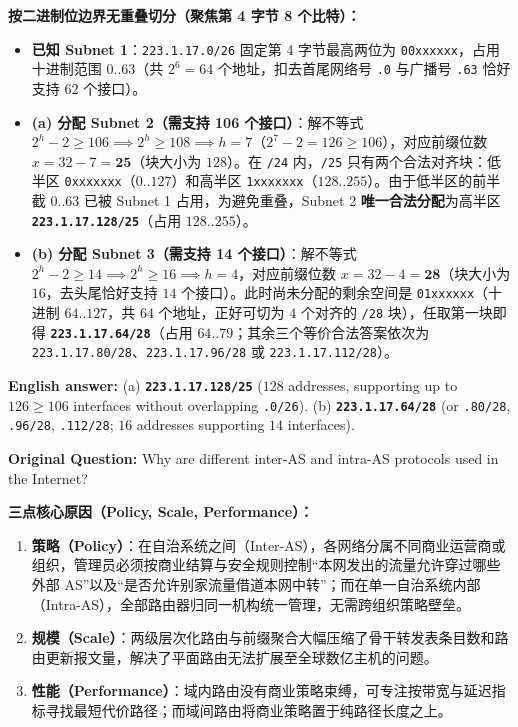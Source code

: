\textbf{按二进制位边界无重叠切分（聚焦第 4 字节 8 个比特）：}
\begin{itemize}
\item \textbf{已知 Subnet 1}：\texttt{223.1.17.0/26} 固定第 4 字节最高两位为 \texttt{00xxxxxx}，占用十进制范围 $0..63$（共 $2^6 = 64$ 个地址，扣去首尾网络号 \texttt{.0} 与广播号 \texttt{.63} 恰好支持 $62$ 个接口）。
\item \textbf{(a) 分配 Subnet 2（需支持 106 个接口）}：解不等式 $2^h - 2 \ge 106 \implies 2^h \ge 108 \implies h = 7$（$2^7 - 2 = 126 \ge 106$），对应前缀位数 $x = 32 - 7 = \mathbf{25}$（块大小为 $128$）。在 \texttt{/24} 内，\texttt{/25} 只有两个合法对齐块：低半区 \texttt{0xxxxxxx}（$0..127$）和高半区 \texttt{1xxxxxxx}（$128..255$）。由于低半区的前半截 $0..63$ 已被 Subnet 1 占用，为避免重叠，Subnet 2 \textbf{唯一合法分配}为高半区 \textbf{\texttt{223.1.17.128/25}}（占用 $128..255$）。
\item \textbf{(b) 分配 Subnet 3（需支持 14 个接口）}：解不等式 $2^h - 2 \ge 14 \implies 2^h \ge 16 \implies h = 4$，对应前缀位数 $x = 32 - 4 = \mathbf{28}$（块大小为 $16$，去头尾恰好支持 $14$ 个接口）。此时尚未分配的剩余空间是 \texttt{01xxxxxx}（十进制 $64..127$，共 64 个地址，正好可切为 4 个对齐的 \texttt{/28} 块），任取第一块即得 \textbf{\texttt{223.1.17.64/28}}（占用 $64..79$；其余三个等价合法答案依次为 \texttt{223.1.17.80/28}、\texttt{223.1.17.96/28} 或 \texttt{223.1.17.112/28}）。
\end{itemize}

\textbf{English answer:} (a) \textbf{\texttt{223.1.17.128/25}} ($128$ addresses, supporting up to $126 \ge 106$ interfaces without overlapping \texttt{.0/26}). (b) \textbf{\texttt{223.1.17.64/28}} (or \texttt{.80/28}, \texttt{.96/28}, \texttt{.112/28}; $16$ addresses supporting $14$ interfaces).



\textbf{Original Question:} Why are different inter-AS and intra-AS protocols used in the Internet?

\textbf{三点核心原因（Policy, Scale, Performance）：}
\begin{enumerate}
\item \textbf{策略（Policy）}：在自治系统之间（Inter-AS），各网络分属不同商业运营商或组织，管理员必须按商业结算与安全规则控制“本网发出的流量允许穿过哪些外部 AS”以及“是否允许别家流量借道本网中转”；而在单一自治系统内部（Intra-AS），全部路由器归同一机构统一管理，无需跨组织策略壁垒。
\item \textbf{规模（Scale）}：两级层次化路由与前缀聚合大幅压缩了骨干转发表条目数和路由更新报文量，解决了平面路由无法扩展至全球数亿主机的问题。
\item \textbf{性能（Performance）}：域内路由没有商业策略束缚，可专注按带宽与延迟指标寻找最短代价路径；而域间路由将商业策略置于纯路径长度之上。
\end{enumerate}

